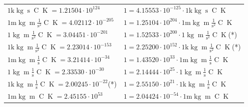 \begin{center}
\begin{longtable}{l l}
{\color{gray}$1 \bm{\mathrm{ k}}\operatorname{kg}{}{\operatorname{s}}{\operatorname{C}}{\operatorname{K}} = 1.21504\cdot10^{124} $}   & {\color{gray}$ 1 = 4.15553\cdot10^{-125} \cdot 1 \bm{\mathrm{ k}}\operatorname{kg}{}{\operatorname{s}}{\operatorname{C}}{\operatorname{K}}$}  \\
{\color{gray}$1 \bm{\mathrm{ m}}\operatorname{kg}{\operatorname{m}}\frac1{\operatorname{s}^2}{\operatorname{C}}{\operatorname{K}} = 4.02112\cdot10^{-205} $}   & {\color{gray}$ 1 = 1.25104\cdot10^{204} \cdot 1 \bm{\mathrm{ m}}\operatorname{kg}{\operatorname{m}}\frac1{\operatorname{s}^2}{\operatorname{C}}{\operatorname{K}}$}  \\
{\color{black}$1 \bm{\mathrm{ }}\operatorname{kg}{\operatorname{m}}\frac1{\operatorname{s}^2}{\operatorname{C}}{\operatorname{K}} = 3.04451\cdot10^{-201} $}   & {\color{black}$ 1 = 1.52533\cdot10^{200} \cdot 1 \bm{\mathrm{ }}\operatorname{kg}{\operatorname{m}}\frac1{\operatorname{s}^2}{\operatorname{C}}{\operatorname{K}}$}\quad(*)\\
{\color{gray}$1 \bm{\mathrm{ k}}\operatorname{kg}{\operatorname{m}}\frac1{\operatorname{s}^2}{\operatorname{C}}{\operatorname{K}} = 2.23014\cdot10^{-153} $}   & {\color{gray}$ 1 = 2.25200\cdot10^{152} \cdot 1 \bm{\mathrm{ k}}\operatorname{kg}{\operatorname{m}}\frac1{\operatorname{s}^2}{\operatorname{C}}{\operatorname{K}}$}\quad(*)\\
{\color{gray}$1 \bm{\mathrm{ m}}\operatorname{kg}{\operatorname{m}}\frac1{\operatorname{s}}{\operatorname{C}}{\operatorname{K}} = 3.21414\cdot10^{-34} $}   & {\color{gray}$ 1 = 1.43520\cdot10^{33} \cdot 1 \bm{\mathrm{ m}}\operatorname{kg}{\operatorname{m}}\frac1{\operatorname{s}}{\operatorname{C}}{\operatorname{K}}$}  \\
{\color{black}$1 \bm{\mathrm{ }}\operatorname{kg}{\operatorname{m}}\frac1{\operatorname{s}}{\operatorname{C}}{\operatorname{K}} = 2.33530\cdot10^{-30} $}   & {\color{black}$ 1 = 2.14444\cdot10^{25} \cdot 1 \bm{\mathrm{ }}\operatorname{kg}{\operatorname{m}}\frac1{\operatorname{s}}{\operatorname{C}}{\operatorname{K}}$}  \\
{\color{gray}$1 \bm{\mathrm{ k}}\operatorname{kg}{\operatorname{m}}\frac1{\operatorname{s}}{\operatorname{C}}{\operatorname{K}} = 2.00245\cdot10^{-22} $}\quad(*) & {\color{gray}$ 1 = 2.55150\cdot10^{21} \cdot 1 \bm{\mathrm{ k}}\operatorname{kg}{\operatorname{m}}\frac1{\operatorname{s}}{\operatorname{C}}{\operatorname{K}}$}  \\
{\color{gray}$1 \bm{\mathrm{ m}}\operatorname{kg}{\operatorname{m}}{}{\operatorname{C}}{\operatorname{K}} = 2.45155\cdot10^{53} $}   & {\color{gray}$ 1 = 2.04424\cdot10^{-54} \cdot 1 \bm{\mathrm{ m}}\operatorname{kg}{\operatorname{m}}{}{\operatorname{C}}{\operatorname{K}}$}  \\

\end{longtable}
\end{center}
